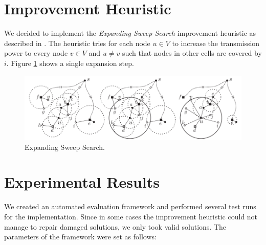 \documentclass{article}
\theoremstyle{definition}
\begin{document}
\section{Improvement Heuristic}

We decided to implement the \emph{Expanding Sweep Search} improvement heuristic as described in \cite{Kang2005}. The heuristic tries for each node $u \in V$ to increase the transmission power to every node $v \in V$ and $u \neq v$ such that nodes in other cells are covered by $i$. Figure \ref{fig:sweep} shows a single expansion step.

\begin{figure}[h]
	\begin{center}
	\includegraphics[width=12cm]{images/sweepsearch.png}
	\end{center}
	\caption{Expanding Sweep Search.} \label{fig:sweep}
\end{figure}

\section{Experimental Results}

We created an automated evaluation framework and performed several test runs for the implementation. Since in some cases the improvement heuristic could not manage to repair damaged solutions, we only took valid solutions. The parameters of the framework were set as follows:
\end{document}
